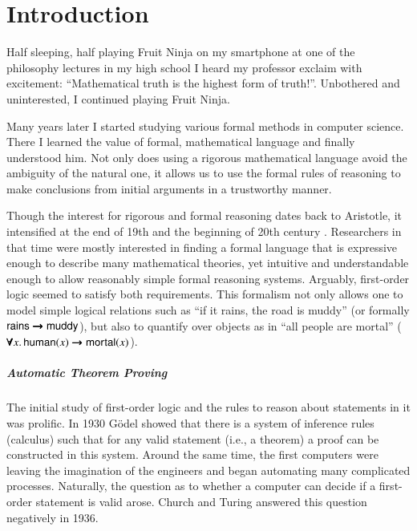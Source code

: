\chapter{Introduction}
\label{ch:intro}

Half sleeping, half playing Fruit Ninja on my smartphone at one of the
philosophy lectures in my high school I heard my professor exclaim with
excitement: “Mathematical truth is the highest form of truth!”.
Unbothered and uninterested, I continued playing Fruit Ninja.

Many years later I started studying various formal methods in computer science.
There I learned the value of formal, mathematical language and finally
understood him. Not only does using a rigorous mathematical language avoid the
ambiguity of the natural one, it allows us to use the formal rules of reasoning
to make conclusions from initial arguments in a trustworthy manner. 

Though the interest for rigorous and formal reasoning dates back to Aristotle,
it intensified at the end of 19th and the beginning of 20th century
\cite{jf-01-modern-logic}. Researchers in that time were mostly interested in
finding a formal language that is expressive enough to describe many
mathematical theories, yet intuitive and understandable enough to allow
reasonably simple formal reasoning systems. Arguably, first-order logic seemed to satisfy
both requirements.  This formalism not only allows one to model simple logical
relations such as ``if it rains, the road is muddy'' (or formally $\mathsf{rains}
\pmb{\rightarrow} \mathsf{muddy}$), but also to quantify over objects as in ``all people
are mortal'' ($\pmb{\forall} x.\, \mathsf{human}(x) \pmb{\rightarrow} \mathsf{mortal}(x)$).

\paragraph{Automatic Theorem Proving}The initial study of first-order logic and
the rules to reason about statements in it was prolific. In 1930 G\"odel
\cite{kg-30-completeness-theorem} showed that there is a system of inference
rules (calculus) such that for any valid statement (i.e., a theorem) a proof can be
constructed in this system. Around the same time, the first computers were
leaving the imagination of the engineers and began automating many complicated
processes.  Naturally, the question as to whether a computer can decide if a
first-order statement is valid  arose. Church
\cite{ac-36-fol-undecidable} and Turing \cite{tm-37-undecidable} answered this
question negatively in 1936.

